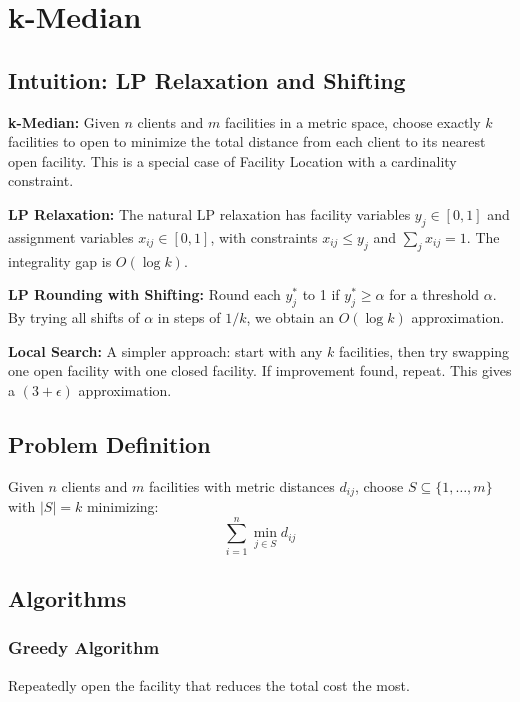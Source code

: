 \setcounter{chapter}{24}
\chapter{k-Median}
\label{ch:kmedian}

\section{Intuition: LP Relaxation and Shifting}

\begin{intuitionbox}
\textbf{k-Median:} Given $n$ clients and $m$ facilities in a metric space, choose exactly $k$ facilities to open to minimize the total distance from each client to its nearest open facility. This is a special case of Facility Location with a cardinality constraint.

\textbf{LP Relaxation:} The natural LP relaxation has facility variables $y_j \in [0,1]$ and assignment variables $x_{ij} \in [0,1]$, with constraints $x_{ij} \le y_j$ and $\sum_j x_{ij} = 1$. The integrality gap is $O(\log k)$.

\textbf{LP Rounding with Shifting:} Round each $y_j^*$ to 1 if $y_j^* \ge \alpha$ for a threshold $\alpha$. By trying all shifts of $\alpha$ in steps of $1/k$, we obtain an $O(\log k)$ approximation.

\textbf{Local Search:} A simpler approach: start with any $k$ facilities, then try swapping one open facility with one closed facility. If improvement found, repeat. This gives a $(3 + \epsilon)$ approximation.
\end{intuitionbox}

\section{Problem Definition}
Given $n$ clients and $m$ facilities with metric distances $d_{ij}$, choose $S \subseteq \{1,\dots,m\}$ with $|S| = k$ minimizing:
\[
\sum_{i=1}^{n} \min_{j \in S} d_{ij}
\]

\section{Algorithms}

\subsection{Greedy Algorithm}
Repeatedly open the facility that reduces the total cost the most.


